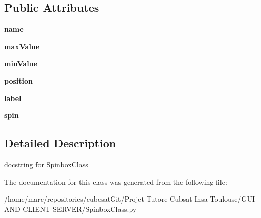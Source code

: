 \subsection*{Public Attributes}
\begin{DoxyCompactItemize}
\item 
\hypertarget{classSpinboxClass_1_1SpinboxClass_a853efed8d820077f22215c9a8f75d8cc}{{\bfseries name}}\label{classSpinboxClass_1_1SpinboxClass_a853efed8d820077f22215c9a8f75d8cc}

\item 
\hypertarget{classSpinboxClass_1_1SpinboxClass_ad3b21f20cb339e97ac7bc56993ce6503}{{\bfseries max\+Value}}\label{classSpinboxClass_1_1SpinboxClass_ad3b21f20cb339e97ac7bc56993ce6503}

\item 
\hypertarget{classSpinboxClass_1_1SpinboxClass_a3ba71911c69d786f8deee897de9887bf}{{\bfseries min\+Value}}\label{classSpinboxClass_1_1SpinboxClass_a3ba71911c69d786f8deee897de9887bf}

\item 
\hypertarget{classSpinboxClass_1_1SpinboxClass_adcae270610302216d1d291dd92324c75}{{\bfseries position}}\label{classSpinboxClass_1_1SpinboxClass_adcae270610302216d1d291dd92324c75}

\item 
\hypertarget{classSpinboxClass_1_1SpinboxClass_a1b5c874bd0afe6998fd01fd03ac8497a}{{\bfseries label}}\label{classSpinboxClass_1_1SpinboxClass_a1b5c874bd0afe6998fd01fd03ac8497a}

\item 
\hypertarget{classSpinboxClass_1_1SpinboxClass_ac68be9f1b64242aa12a958bb932cc00a}{{\bfseries spin}}\label{classSpinboxClass_1_1SpinboxClass_ac68be9f1b64242aa12a958bb932cc00a}

\end{DoxyCompactItemize}


\subsection{Detailed Description}
\begin{DoxyVerb}docstring for SpinboxClass\end{DoxyVerb}
 

The documentation for this class was generated from the following file\+:\begin{DoxyCompactItemize}
\item 
/home/marc/repositories/cubesat\+Git/\+Projet-\/\+Tutore-\/\+Cubsat-\/\+Insa-\/\+Toulouse/\+G\+U\+I-\/\+A\+N\+D-\/\+C\+L\+I\+E\+N\+T-\/\+S\+E\+R\+V\+E\+R/Spinbox\+Class.\+py\end{DoxyCompactItemize}
